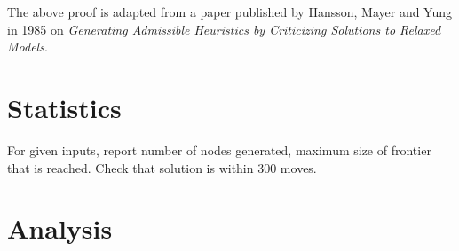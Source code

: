 \documentclass[11pt, a4paper]{article}
\begin{document}
The above proof is adapted from a paper published by Hansson, Mayer and Yung in 1985 on \textit{Generating Admissible Heuristics by Criticizing Solutions to Relaxed Models}.
\section{Statistics}
For given inputs, report number of nodes generated, maximum size of frontier that is reached. Check that solution is within 300 moves.

\section{Analysis}
\end{document}
